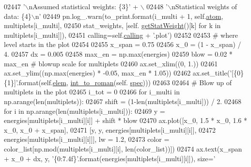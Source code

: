 \begin{DoxyCode}
02447                              \textcolor{stringliteral}{'\(\backslash\)nAssumed statistical weights: \{3\}'} + \(\backslash\)
02448                              \textcolor{stringliteral}{'\(\backslash\)nStatistical weights of data: \{4\}\(\backslash\)n'}
02449                     pn.log\_.warn(to\_print.format(i\_multi + 1, self.\hyperlink{classpyneb_1_1core_1_1pynebcore_1_1_atom_a192f3e20446d7fba81d789bc705d6c71}{atom}, multiplets[i\_multi], 
02450                                                  stat\_weights, [self.
      \hyperlink{classpyneb_1_1core_1_1pynebcore_1_1_atom_a0f2483487115f19556586b9e422bd5fb}{getStatWeight}()[k] \textcolor{keywordflow}{for} k \textcolor{keywordflow}{in} multiplets[i\_multi]]), 
02451                                  calling=self.\hyperlink{classpyneb_1_1core_1_1pynebcore_1_1_atom_a373b7735acf4f528b54bddf373ad67a1}{calling} + \textcolor{stringliteral}{'.plot'})
02452 
02453         \textcolor{comment}{# where level starts in the plot}
02454        
02455         x\_span = 0.75
02456         x\_0 = (1 - x\_span) / 4.    
02457         dx = 0.005
02458         max\_en = np.max(energies)
02459         blow = 0.02 * max\_en \textcolor{comment}{# blowup scale for multiplets}
02460         ax.set\_xlim((0, 1.))
02461         ax.set\_ylim((np.max(energies) * -0.05, max\_en * 1.05))
02462         ax.set\_title(\textcolor{stringliteral}{'[\{0\} \{1\}]'}.format(self.\hyperlink{classpyneb_1_1core_1_1pynebcore_1_1_atom_ae722bd0e35e1c8cdc0018d56c34171cf}{elem}, \hyperlink{namespacepyneb_1_1utils_1_1misc_aec4e973d4cb9299f749ef190ea636a06}{int\_to\_roman}(self.
      \hyperlink{classpyneb_1_1core_1_1pynebcore_1_1_atom_a02c0f7146a2f5b8eac765a453c763797}{spec})))
02463 
02464         \textcolor{comment}{# Blow up of multiplets in the plot}
02465         i\_tot = 0
02466         \textcolor{keywordflow}{for} i\_multi \textcolor{keywordflow}{in} np.arange(len(multiplets)):
02467             shift = (1-len(multiplets[i\_multi])) / 2.
02468             \textcolor{keywordflow}{for} i \textcolor{keywordflow}{in} np.arange(len(multiplets[i\_multi])):
02469                 y = energies[multiplets[i\_multi][i]] + shift * blow
02470                 ax.plot([x\_0, 1.5 * x\_0, 1.6 * x\_0, x\_0 + x\_span], 
02471                          [y, y, energies[multiplets[i\_multi][i]], 
02472                           energies[multiplets[i\_multi][i]]], lw = 1.2, 
02473                          color = color\_list[np.mod(multiplets[i\_multi][i], len(color\_list))])
02474                 ax.text(x\_span + x\_0 + dx, y, \textcolor{stringliteral}{'\{0:7.4f\}'}.format(energies[multiplets[i\_multi][i]]), size=\textcolor{stringliteral}{'
}
\end{DoxyCode}
